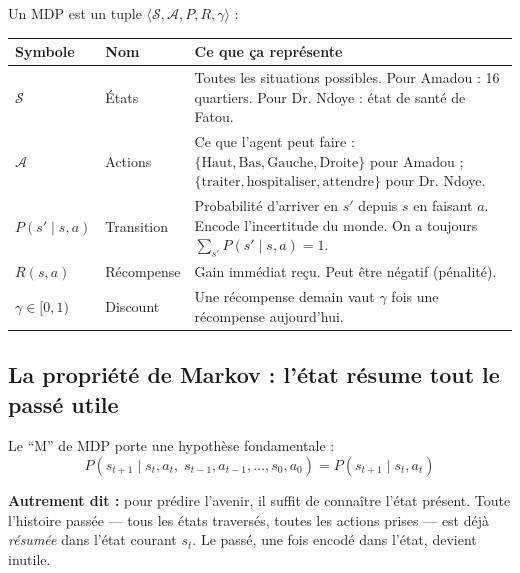 \documentclass[11pt,a4paper]{article}
\begin{document}
\begin{definitionbox}
Un MDP est un tuple $\langle \mathcal{S}, \mathcal{A}, P, R, \gamma \rangle$ :
\begin{center}
\renewcommand{\arraystretch}{1.4}
\begin{tabular}{llp{7.8cm}}
\toprule
\textbf{Symbole} & \textbf{Nom} & \textbf{Ce que ça représente} \\
\midrule
$\mathcal{S}$ & États & Toutes les situations possibles. Pour Amadou : 16 quartiers. Pour Dr. Ndoye : état de santé de Fatou. \\
$\mathcal{A}$ & Actions & Ce que l'agent peut faire : $\{\text{Haut}, \text{Bas}, \text{Gauche}, \text{Droite}\}$ pour Amadou ; $\{\text{traiter}, \text{hospitaliser}, \text{attendre}\}$ pour Dr. Ndoye. \\
$P(s' \mid s, a)$ & Transition & Probabilité d'arriver en $s'$ depuis $s$ en faisant $a$. Encode l'incertitude du monde. On a toujours $\sum_{s'} P(s' \mid s,a) = 1$. \\
$R(s, a)$ & Récompense & Gain immédiat reçu. Peut être négatif (pénalité). \\
$\gamma \in [0,1)$ & Discount & Une récompense demain vaut $\gamma$ fois une récompense aujourd'hui. \\
\bottomrule
\end{tabular}
\end{center}
\end{definitionbox}

\subsection{La propriété de Markov : l'état résume tout le passé utile}

Le ``M'' de MDP porte une hypothèse fondamentale :
$$P(s_{t+1} \mid s_t, a_t,\; s_{t-1}, a_{t-1}, \ldots, s_0, a_0) = P(s_{t+1} \mid s_t, a_t)$$

\textbf{Autrement dit :} pour prédire l'avenir, il suffit de connaître l'état présent. Toute l'histoire passée --- tous les états traversés, toutes les actions prises --- est déjà \textit{résumée} dans l'état courant $s_t$. Le passé, une fois encodé dans l'état, devient inutile.
\end{document}
